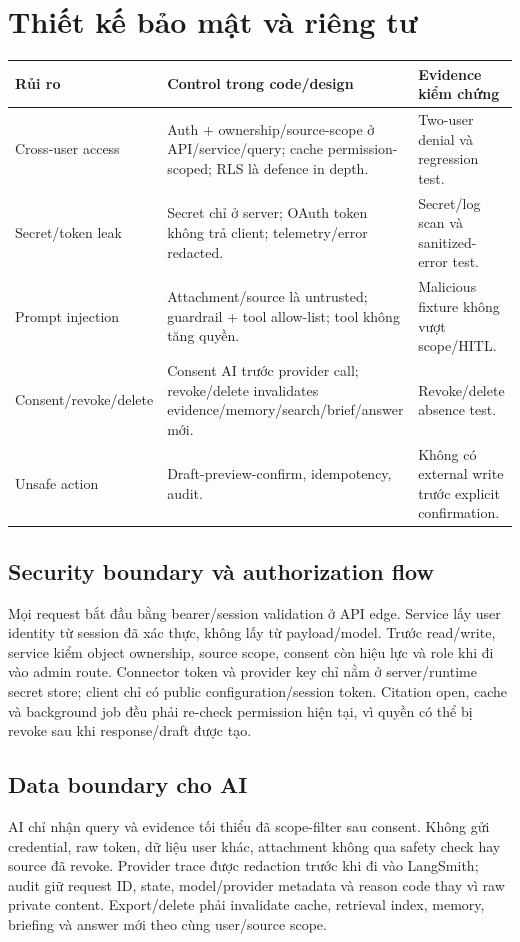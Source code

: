 \documentclass[12pt,a4paper]{article}
\begin{document}
\section{Thiết kế bảo mật và riêng tư}
\begin{longtable}{p{3.5cm}p{5cm}p{5.5cm}}
\toprule Rủi ro & Control trong code/design & Evidence kiểm chứng \\ \midrule
\endhead
Cross-user access & Auth + ownership/source-scope ở API/service/query; cache permission-scoped; RLS là defence in depth. & Two-user denial và regression test. \\
Secret/token leak & Secret chỉ ở server; OAuth token không trả client; telemetry/error redacted. & Secret/log scan và sanitized-error test. \\
Prompt injection & Attachment/source là untrusted; guardrail + tool allow-list; tool không tăng quyền. & Malicious fixture không vượt scope/HITL. \\
Consent/revoke/delete & Consent AI trước provider call; revoke/delete invalidates evidence/memory/search/brief/answer mới. & Revoke/delete absence test. \\
Unsafe action & Draft-preview-confirm, idempotency, audit. & Không có external write trước explicit confirmation. \\
\bottomrule
\end{longtable}

\subsection{Security boundary và authorization flow}
Mọi request bắt đầu bằng bearer/session validation ở API edge. Service lấy user
identity từ session đã xác thực, không lấy từ payload/model. Trước read/write,
service kiểm object ownership, source scope, consent còn hiệu lực và role khi
đi vào admin route. Connector token và provider key chỉ nằm ở server/runtime
secret store; client chỉ có public configuration/session token. Citation open,
cache và background job đều phải re-check permission hiện tại, vì quyền có thể
bị revoke sau khi response/draft được tạo.

\subsection{Data boundary cho AI}
AI chỉ nhận query và evidence tối thiểu đã scope-filter sau consent. Không gửi
credential, raw token, dữ liệu user khác, attachment không qua safety check hay
source đã revoke. Provider trace được redaction trước khi đi vào LangSmith;
audit giữ request ID, state, model/provider metadata và reason code thay vì raw
private content. Export/delete phải invalidate cache, retrieval index, memory,
briefing và answer mới theo cùng user/source scope.
\end{document}

